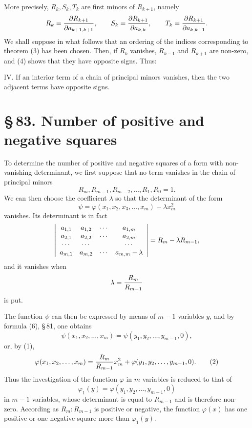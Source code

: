 \documentclass[11pt]{article}
\providecommand{\sect}[2]{\section*{\S\,#1. #2}}
\begin{document}
More precisely, $R_k,S_k,T_k$ are first minors of $R_{k+1}$, namely
\[
        R_k={\partial R_{k+1}\over \partial a_{k+1,k+1}},
        \qquad
        S_k={\partial R_{k+1}\over \partial a_{k,k}},
        \qquad
        T_k={\partial R_{k+1}\over \partial a_{k,k+1}}.
\]
We shall suppose in what follows that an ordering of the indices corresponding to theorem (3) has been chosen. Then, if $R_k$ vanishes, $R_{k-1}$ and $R_{k+1}$ are non-zero, and (4) shows that they have opposite signs. Thus:

IV. If an interior term of a chain of principal minors vanishes, then the two adjacent terms have opposite signs.

\sect{83}{Number of positive and negative squares}

To determine the number of positive and negative squares of a form with non-vanishing determinant, we first suppose that no term vanishes in the chain of principal minors
\[
        R_m,
        R_{m-1},
        R_{m-2},
        \ldots,
        R_1,
        R_0=1.
\]
We can then choose the coefficient $\lambda$ so that the determinant of the form
\begin{equation}
        \psi=\varphi(x_1,x_2,x_3,
\ldots,x_m)-\lambda x_m^2
\tag{1}
\end{equation}
vanishes. Its determinant is in fact
\[
\left|\begin{array}{cccc}
 a_{1,1}&a_{1,2}&\cdots&a_{1,m}\cr
 a_{2,1}&a_{2,2}&\cdots&a_{2,m}\cr
 \cdots&\cdots&&\cdots\cr
 a_{m,1}&a_{m,2}&\cdots&a_{m,m}-\lambda
\end{array}\right|
      =R_m-\lambda R_{m-1},
\]
and it vanishes when
\[
        \lambda={R_m\over R_{m-1}}
\]
is put.

The function $\psi$ can then be expressed by means of $m-1$ variables $y$, and by formula (6), \S\,81, one obtains
\[
        \psi(x_1,x_2,
\ldots,x_m)=\psi(y_1,y_2,
\ldots,y_{m-1},0),
\]
or, by (1),
\begin{equation}
        \varphi(x_1,x_2,
\ldots,x_m)= {R_m\over R_{m-1}}x_m^2+
        \varphi(y_1,y_2,
\ldots,y_{m-1},0).
\tag{2}
\end{equation}
Thus the investigation of the function $\varphi$ in $m$ variables is reduced to that of
\[
        \varphi_1(y)=\varphi(y_1,y_2,
\ldots,y_{m-1},0)
\]
in $m-1$ variables, whose determinant is equal to $R_{m-1}$ and is therefore non-zero. According as $R_m:R_{m-1}$ is positive or negative, the function $\varphi(x)$ has one positive or one negative square more than $\varphi_1(y)$.
\end{document}
